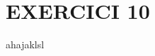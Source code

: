\documentclass[a4paper, 11pt]{article}
\begin{document}

\section*{EXERCICI 10}
\noindent ahajaklsl
\vspace{5mm}


























\newpage
\printbibliography
\end{document}
